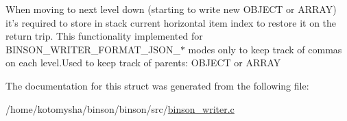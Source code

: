 When moving to next level down (starting to write new O\-B\-J\-E\-C\-T or A\-R\-R\-A\-Y) it's required to store in stack current horizontal item index to restore it on the return trip. This functionality implemented for B\-I\-N\-S\-O\-N\-\_\-\-W\-R\-I\-T\-E\-R\-\_\-\-F\-O\-R\-M\-A\-T\-\_\-\-J\-S\-O\-N\-\_\-$\ast$ modes only to keep track of commas on each level.\-Used to keep track of parents\-: O\-B\-J\-E\-C\-T or A\-R\-R\-A\-Y 

The documentation for this struct was generated from the following file\-:\begin{DoxyCompactItemize}
\item 
/home/kotomysha/binson/binson/src/\hyperlink{binson__writer_8c}{binson\-\_\-writer.\-c}\end{DoxyCompactItemize}
